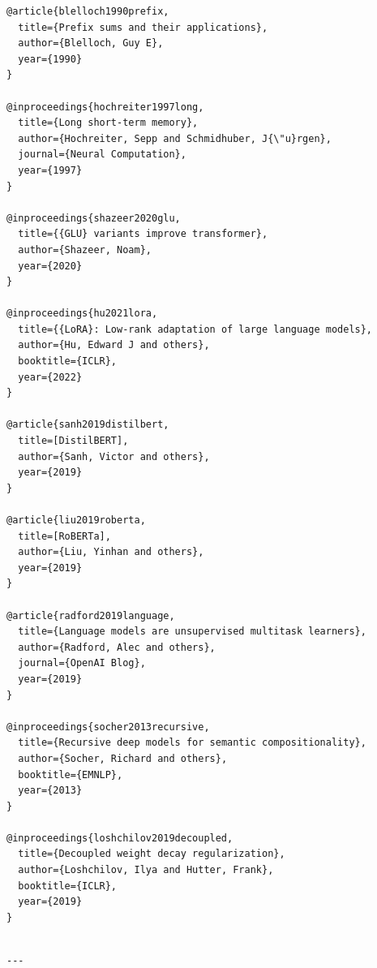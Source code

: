 \begin{lstlisting}
@article{blelloch1990prefix,
  title={Prefix sums and their applications},
  author={Blelloch, Guy E},
  year={1990}
}

@inproceedings{hochreiter1997long,
  title={Long short-term memory},
  author={Hochreiter, Sepp and Schmidhuber, J{\"u}rgen},
  journal={Neural Computation},
  year={1997}
}

@inproceedings{shazeer2020glu,
  title={{GLU} variants improve transformer},
  author={Shazeer, Noam},
  year={2020}
}

@inproceedings{hu2021lora,
  title={{LoRA}: Low-rank adaptation of large language models},
  author={Hu, Edward J and others},
  booktitle={ICLR},
  year={2022}
}

@article{sanh2019distilbert,
  title=[DistilBERT],
  author={Sanh, Victor and others},
  year={2019}
}

@article{liu2019roberta,
  title=[RoBERTa],
  author={Liu, Yinhan and others},
  year={2019}
}

@article{radford2019language,
  title={Language models are unsupervised multitask learners},
  author={Radford, Alec and others},
  journal={OpenAI Blog},
  year={2019}
}

@inproceedings{socher2013recursive,
  title={Recursive deep models for semantic compositionality},
  author={Socher, Richard and others},
  booktitle={EMNLP},
  year={2013}
}

@inproceedings{loshchilov2019decoupled,
  title={Decoupled weight decay regularization},
  author={Loshchilov, Ilya and Hutter, Frank},
  booktitle={ICLR},
  year={2019}
}
\end{lstlisting}
\begin{lstlisting}

---
\end{lstlisting}